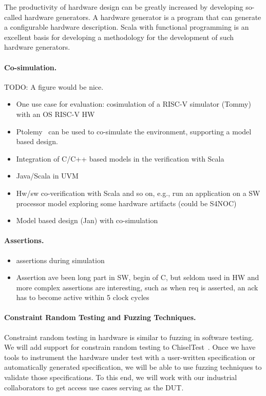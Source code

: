 \documentclass[conference]{IEEEtran}
\newcommand{\todo}[1]{{\color{olive} TODO: #1}}
\begin{document}
The productivity of hardware design can be greatly increased by developing so-called
hardware generators. A hardware generator is a program that can generate a configurable
hardware description.
Scala with functional programming is an excellent basis for developing a methodology for the
development of such hardware generators.



\paragraph{Co-simulation.}

\todo{A figure would be nice.}

\begin{itemize}
\item One use case for evaluation: cosimulation of a RISC-V simulator (Tommy) with an OS RISC-V HW 
\item Ptolemy~\cite{ptolemyII-book} can be used to co-simulate the environment, supporting a model based design.
\item Integration of C/C++ based models in the verification with Scala
\item Java/Scala in UVM
\item Hw/sw co-verification with Scala and so on, e.g., run an application on a SW processor model exploring some hardware artifacts (could be S4NOC)
\item Model based design (Jan) with co-simulation
\end{itemize}

\paragraph{Assertions.}

\begin{itemize}
\item assertions during simulation
\item Assertion ave been long part in SW, begin of C, but seldom used in HW and more complex assertions are interesting, such as when req is asserted, an ack has to become active within 5 clock cycles
\end{itemize}

\paragraph{Constraint Random Testing and Fuzzing Techniques.}

Constraint random testing in hardware is similar to fuzzing in software testing.
We will add support for constrain random testing to ChiselTest~\cite{chisel:tester2}.
Once we have tools to instrument the hardware under test with a user-written
specification or automatically generated specification, we will be able to use fuzzing techniques
to validate those specifications. To this end, we will work
with our industrial collaborators to get access use cases serving
as the DUT.
\end{document}
